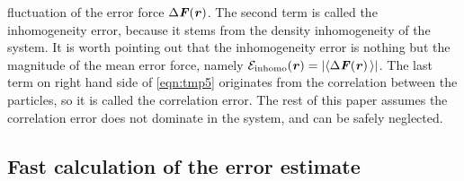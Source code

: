 \documentclass[aps,pre,preprint]{revtex4-1}
\renewcommand{\v}[1]{\textbf{\textit{#1}}}
\begin{document}
fluctuation of the error force $\Delta\v F(\v r)$.  The second term is
called the inhomogeneity error, because it stems from the density
inhomogeneity of the system. It is worth pointing out that the
inhomogeneity error is nothing but the magnitude of the mean error force,
namely $\mathcal E_{\textrm{inhomo}}(\v r) = \vert\langle\Delta\v F(\v
r)\,\rangle\vert$.  The last term on right hand side of \eqref{eqn:tmp5} originates from the
correlation between the particles, so it is called the correlation
error.
The rest of this paper
assumes the 
correlation error does not dominate in the system, and can be safely
neglected.



\subsection{Fast calculation of the error estimate}\label{sec:tmp1.3}
\end{document}
